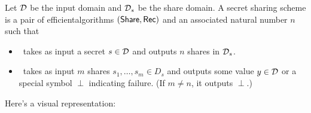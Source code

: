 \begin{definition}\label{def:ss}
    Let $\mathcal{D}$ be the input domain and $\mathcal{D}_s$ be the share domain.
    A secret sharing scheme is a pair of efficient\footnotemark algorithms 
    $(\mathsf{Share}, \mathsf{Rec})$ and an associated natural number $n$ such that

    \begin{itemize}
        \item \share~takes as input a secret $s \in \mathcal{D}$ and outputs $n$ 
        shares in $\mathcal{D}_s$.
        \item \rec~takes as input $m$ shares $s_1, \ldots, s_m \in D_s$ 
        and outputs some value $y \in \mathcal{D}$ or a special symbol $\perp$ 
        indicating failure. (If $m \neq n$, it outputs $\perp$.\footnotemark)
    \end{itemize}
\end{definition}



Here's a visual representation: 


